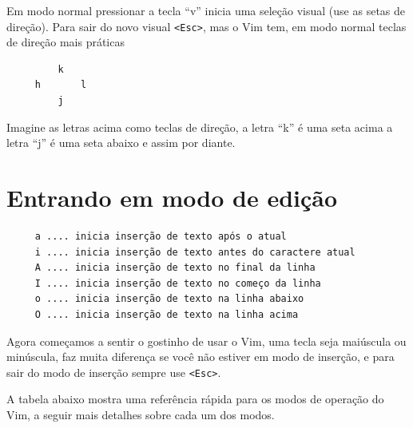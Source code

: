 \documentclass[10pt,a4paper,openany]{book}
\begin{document}
Em modo normal pressionar a tecla ``v'' inicia uma seleção visual (use as setas de direção).
Para sair do novo visual \verb|<Esc>|, mas o Vim tem, em modo normal teclas de direção mais práticas

\begin{verbatim}
         k
     h       l
         j
\end{verbatim}

Imagine as letras acima como teclas de direção, a letra ``k'' é uma seta acima
a letra ``j'' é uma seta abaixo e assim por diante.

\section{Entrando em modo de edição}
\label{Entrando em modo de edição}

\begin{verbatim}
     a .... inicia inserção de texto após o atual
     i .... inicia inserção de texto antes do caractere atual
     A .... inicia inserção de texto no final da linha
     I .... inicia inserção de texto no começo da linha
     o .... inicia inserção de texto na linha abaixo
     O .... inicia inserção de texto na linha acima
\end{verbatim}

Agora começamos a sentir o gostinho de usar o Vim, uma tecla seja
maiúscula ou minúscula, faz muita diferença se você não estiver em
modo de inserção, e para sair do modo de inserção sempre use \verb|<Esc>|.

A tabela abaixo mostra uma referência rápida para os modos de operação do Vim,
a seguir mais detalhes sobre cada um dos modos.
\end{document}
